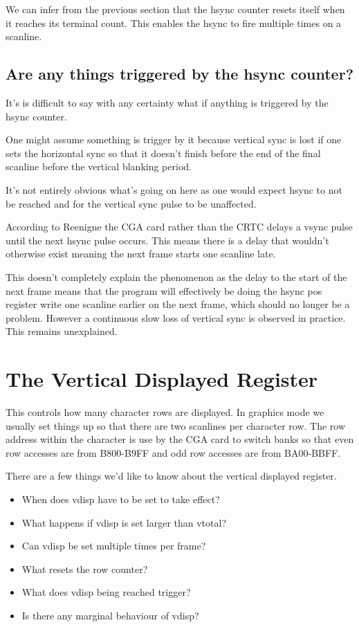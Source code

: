 \documentclass[a4paper,10pt]{amsart}
\begin{document}
We can infer from the previous section that the hsync counter resets itself
when it reaches its terminal count. This enables the hsync to fire multiple
times on a scanline.

\subsection{Are any things triggered by the hsync counter?}

It's is difficult to say with any certainty what if anything is triggered by
the hsync counter.

One might assume something is trigger by it because vertical sync is lost
if one sets the horizontal sync so that it doesn't finish before the end of
the final scanline before the vertical blanking period.

It's not entirely obvious what's going on here as one would expect hsync to
not be reached and for the vertical sync pulse to be unaffected.

According to Reenigne the CGA card rather than the CRTC delays a vsync pulse
until the next hsync pulse occurs. This means there is a delay that wouldn't
otherwise exist meaning the next frame starts one scanline late.

This doesn't completely explain the phenomenon as the delay to the start of
the next frame means that the program will effectively be doing the hsync pos
register write one scanline earlier on the next frame, which should no longer
be a problem. However a continuous slow loss of vertical sync is observed in
practice. This remains unexplained.

\section{The Vertical Displayed Register}

This controls how many character rows are displayed. In graphics mode we
usually set things up so that there are two scanlines per character row.
The row address within the character is use by the CGA card to switch banks
so that even row accesses are from B800-B9FF and odd row accesses are from
BA00-BBFF.

There are a few things we'd like to know about the vertical displayed
register.

\begin{itemize}
\item When does vdisp have to be set to take effect?
\item What happens if vdisp is set larger than vtotal?
\item Can vdisp be set multiple times per frame?
\item What resets the row counter?
\item What does vdisp being reached trigger?
\item Is there any marginal behaviour of vdisp?
\end{itemize}
\end{document}
